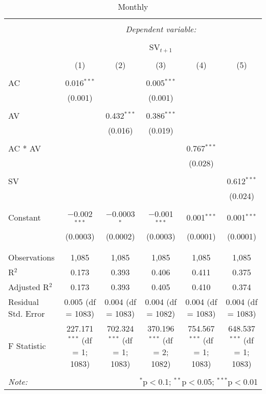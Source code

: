
\begin{table}[!htbp] \centering 
  \caption{Monthly} 
  \label{} 
\begin{adjustbox}{width=1\textwidth}
	\begin{tabular}{@{\extracolsep{5pt}}lccccc} 
\\[-1.8ex]\hline 
\hline \\[-1.8ex] 
 & \multicolumn{5}{c}{\textit{Dependent variable:}} \\ 
\cline{2-6} 
\\[-1.8ex] & \multicolumn{5}{c}{SV$_{t+1}$} \\ 
\\[-1.8ex] & (1) & (2) & (3) & (4) & (5)\\ 
\hline \\[-1.8ex] 
 AC & 0.016$^{***}$ &  & 0.005$^{***}$ &  &  \\ 
  & (0.001) &  & (0.001) &  &  \\ 
  & & & & & \\ 
 AV &  & 0.432$^{***}$ & 0.386$^{***}$ &  &  \\ 
  &  & (0.016) & (0.019) &  &  \\ 
  & & & & & \\ 
 AC * AV &  &  &  & 0.767$^{***}$ &  \\ 
  &  &  &  & (0.028) &  \\ 
  & & & & & \\ 
 SV &  &  &  &  & 0.612$^{***}$ \\ 
  &  &  &  &  & (0.024) \\ 
  & & & & & \\ 
 Constant & $-$0.002$^{***}$ & $-$0.0003$^{*}$ & $-$0.001$^{***}$ & 0.001$^{***}$ & 0.001$^{***}$ \\ 
  & (0.0003) & (0.0002) & (0.0003) & (0.0001) & (0.0001) \\ 
  & & & & & \\ 
\hline \\[-1.8ex] 
Observations & 1,085 & 1,085 & 1,085 & 1,085 & 1,085 \\ 
R$^{2}$ & 0.173 & 0.393 & 0.406 & 0.411 & 0.375 \\ 
Adjusted R$^{2}$ & 0.173 & 0.393 & 0.405 & 0.410 & 0.374 \\ 
Residual Std. Error & 0.005 (df = 1083) & 0.004 (df = 1083) & 0.004 (df = 1082) & 0.004 (df = 1083) & 0.004 (df = 1083) \\ 
F Statistic & 227.171$^{***}$ (df = 1; 1083) & 702.324$^{***}$ (df = 1; 1083) & 370.196$^{***}$ (df = 2; 1082) & 754.567$^{***}$ (df = 1; 1083) & 648.537$^{***}$ (df = 1; 1083) \\ 
\hline 
\hline \\[-1.8ex] 
\textit{Note:}  & \multicolumn{5}{r}{$^{*}$p$<$0.1; $^{**}$p$<$0.05; $^{***}$p$<$0.01} \\ 
\end{tabular}
\end{adjustbox} 
\end{table} 
